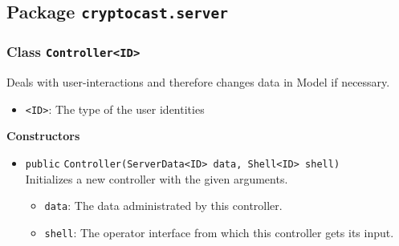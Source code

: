 \subsection{Package \lstinline!cryptocast.server!}

\subsubsection{Class \lstinline|Controller<ID>|}
Deals with user-interactions and therefore changes data in Model if necessary. \\


\begin{itemize}
\item \lstinline|<ID>|: The type of the user identities
\end{itemize}


\textbf{Constructors}
\begin{itemize}
\item \lstinline|public| \lstinline|Controller|\lstinline|(ServerData<ID> data, Shell<ID> shell)|\\
Initializes a new controller with the given arguments.
\begin{itemize}
\item \lstinline|data|: The data administrated by this controller.
\item \lstinline|shell|: The operator interface from which this controller gets its input.
\end{itemize}



\end{itemize}


